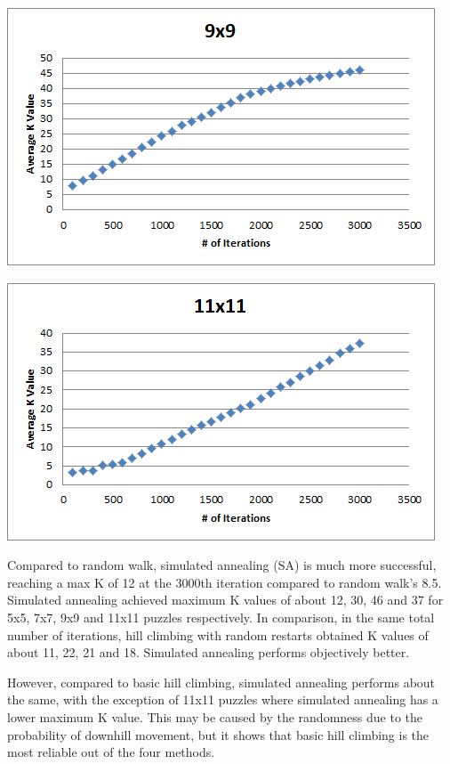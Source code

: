 \documentclass[12pt, letterpaper]{article}
\begin{document}
\includegraphics[width=\linewidth]{"Task 6/9x9 Scatterplot"}

\includegraphics[width=\linewidth]{"Task 6/11x11 Scatterplot"}

Compared to random walk, simulated annealing (SA) is much more successful, reaching a max K of 12 at the 3000th iteration compared to random walk's 8.5. Simulated annealing achieved maximum K values of about 12, 30, 46 and 37 for 5x5, 7x7, 9x9 and 11x11 puzzles respectively. In comparison, in the same total number of iterations, hill climbing with random restarts obtained K values of about 11, 22, 21 and 18. Simulated annealing performs objectively better. 

However, compared to basic hill climbing, simulated annealing performs about the same, with the exception of 11x11 puzzles where simulated annealing has a lower maximum K value. This may be caused by the randomness due to the probability of downhill movement, but it shows that basic hill climbing is the most reliable out of the four methods.
\end{document}
